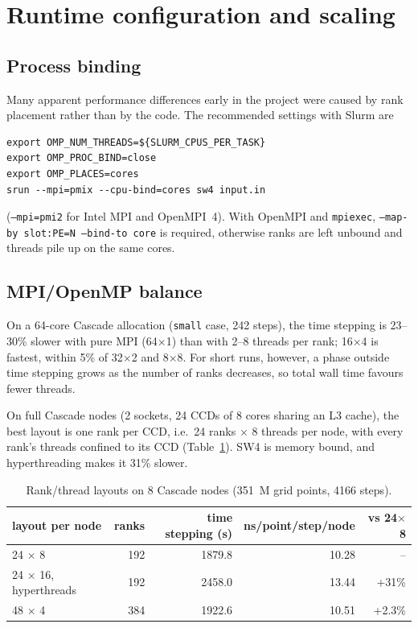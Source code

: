 \documentclass[11pt,a4paper]{article}
\newcommand{\code}[1]{\texttt{#1}}
\begin{document}
\section{Runtime configuration and scaling}
\label{sec:scaling}

\subsection{Process binding}
Many apparent performance differences early in the project were caused by rank
placement rather than by the code. The recommended settings with Slurm are
\begin{lstlisting}
export OMP_NUM_THREADS=${SLURM_CPUS_PER_TASK}
export OMP_PROC_BIND=close
export OMP_PLACES=cores
srun --mpi=pmix --cpu-bind=cores sw4 input.in
\end{lstlisting}
(\code{--mpi=pmi2} for Intel MPI and OpenMPI~4). With OpenMPI and
\code{mpiexec}, \code{--map-by slot:PE=N --bind-to core} is required, otherwise
ranks are left unbound and threads pile up on the same cores.

\subsection{MPI/OpenMP balance}
On a 64-core Cascade allocation (\code{small} case, 242 steps), the time
stepping is 23--30\% slower with pure MPI (64$\times$1) than with 2--8 threads
per rank; 16$\times$4 is fastest, within 5\% of 32$\times$2 and 8$\times$8.
For short runs, however, a phase outside time stepping grows as the number of
ranks decreases, so total wall time favours fewer threads.

On full Cascade nodes (2 sockets, 24 CCDs of 8 cores sharing an L3 cache),
the best layout is one rank per CCD, i.e.\ 24 ranks $\times$ 8 threads per
node, with every rank's threads confined to its CCD
(Table~\ref{tab:layout}). SW4 is memory bound, and hyperthreading makes it
31\% slower.

\begin{table}[ht]
  \centering
  \caption{Rank/thread layouts on 8 Cascade nodes (351~M grid points, 4166 steps).}
  \label{tab:layout}
  \begin{tabular}{lrrrr}
    \toprule
    layout per node & ranks & time stepping (s) & ns/point/step/node & vs 24$\times$8 \\
    \midrule
    24 $\times$ 8 & 192 & 1879.8 & 10.28 & -- \\
    24 $\times$ 16, hyperthreads & 192 & 2458.0 & 13.44 & +31\% \\
    48 $\times$ 4 & 384 & 1922.6 & 10.51 & +2.3\% \\
    \bottomrule
  \end{tabular}
\end{table}
\end{document}
